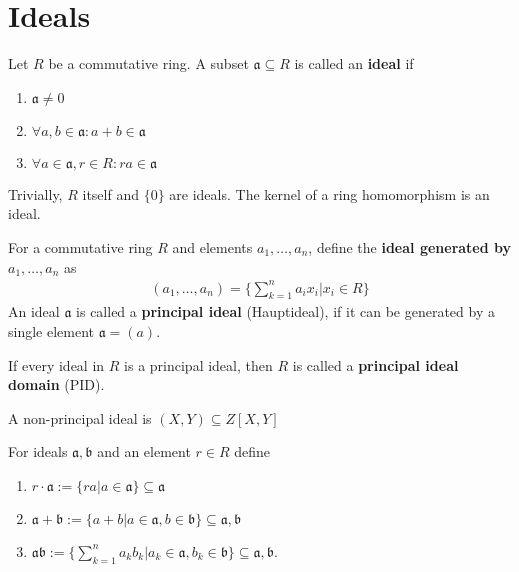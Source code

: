 \section{Ideals}
\begin{dfn}[]
  Let $R$ be a commutative ring. A subset $\mathfrak{a} \subseteq R$ is called an \textbf{ideal} if
  \begin{enumerate}
    \item $\mathfrak{a} \neq 0$
    \item $\forall a,b \in \mathfrak{a}: a + b \in \mathfrak{a}$
    \item $\forall a \in \mathfrak{a}, r \in R: r a \in \mathfrak{a}$
  \end{enumerate}
\end{dfn}

Trivially, $R$ itself and $\{0\}$ are ideals. The kernel of a ring homomorphism is an ideal.


\begin{dfn}[]
For a commutative ring $R$ and elements $a_1,\ldots,a_n$, define the \textbf{ideal generated by} $a_1,\ldots,a_n$ as
\begin{align*}
  (a_1,\ldots,a_n) = \{\sum_{k=1}^{n}a_i x_i \big\vert x_i \in R\}
\end{align*}
An ideal $\mathfrak{a}$ is called a \textbf{principal ideal} (Hauptideal), if it can be generated by a single element $\mathfrak{a} = (a)$.

If every ideal in $R$ is a principal ideal, then $R$ is called a \textbf{principal ideal domain} (PID).
\end{dfn}

A non-principal ideal is $(X,Y) \subseteq Z[X,Y]$

\begin{dfn}[]
For ideals $\mathfrak{a},\mathfrak{b}$ and an element $r \in R$ define
\begin{enumerate}
  \item $r \cdot \mathfrak{a} := \{r a \big\vert a \in \mathfrak{a}\} \subseteq \mathfrak{a}$
  \item $\mathfrak{a} + \mathfrak{b} := \{a + b \big\vert a\in \mathfrak{a}, b \in \mathfrak{b}\} \subseteq \mathfrak{a},\mathfrak{b}$
  \item $\mathfrak{a} \mathfrak{b} := \{\sum_{k=1}^{n}a_kb_k \big\vert a_k \in \mathfrak{a}, b_k \in \mathfrak{b}\} \subseteq \mathfrak{a},\mathfrak{b}$.
\end{enumerate}
\end{dfn}



